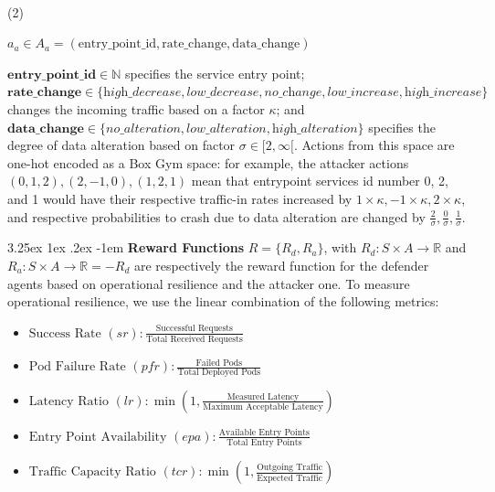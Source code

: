 \documentclass[conference]{IEEEtran}
\makeatletter
\renewcommand\paragraph{\@startsection{paragraph}{5}{\z@}%
  {3.25ex \@plus1ex \@minus.2ex}%
  {-1em}%
  {\normalfont\normalsize\bfseries}}
\makeatother
\begin{document}
\

\indent\begin{minipage}{0.06\linewidth}
    (2)
\end{minipage}
\begin{minipage}{0.9\linewidth}
    \raggedright
    $\displaystyle a_a \in A_a = (\text{entry\_point\_id}, \text{rate\_change}, \text{data\_change})$
\end{minipage}

\vspace{0.3cm}

\indent $\mathbf{entry\_point\_id} \in \mathbb{N}$ specifies the service entry point;
$\mathbf{rate\_change} \in \{\textit{high\_decrease}, \textit{low\_decrease}, \textit{no\_change}, \allowbreak \textit{low\_increase}, \allowbreak \textit{high\_increase}\}$ changes the incoming traffic based on a factor $\kappa$; and $\mathbf{data\_change} \in \{\textit{no\_alteration}, \allowbreak \textit{low\_alteration}, \allowbreak \textit{high\_alteration}\}$ specifies the degree of data alteration based on factor $\sigma \in [2,\infty[$. Actions from this space are one-hot encoded as a Box Gym space: for example, the attacker actions $(0,1,2), (2,-1,0), (1,2,1)$ mean that entrypoint services id number 0, 2, and 1 would have their respective traffic-in rates increased by $1 \times \kappa, -1 \times \kappa, 2 \times \kappa$, and respective probabilities to crash due to data alteration are changed by $\frac{2}{\sigma}, \frac{0}{\sigma}, \frac{1}{\sigma}$.


\noindent \paragraph{\textbf{Reward Functions}} $R = \{R_d, R_a\}$, with $R_d: S \times A \to \mathbb{R}$ and $R_a: S \times A \to \mathbb{R} = - R_d$ are respectively the reward function for the defender agents based on operational resilience and the attacker one.
To measure operational resilience, we use the linear combination of the following metrics:
%
\begin{itemize}
    \vspace{0.15cm}
    \item $\text{Success Rate } (sr) : \frac{\text{Successful Requests}}{\text{Total Received Requests}}$
    \vspace{0.15cm}
    \item $\text{Pod Failure Rate } (pfr) : \frac{\text{Failed Pods}}{\text{Total Deployed Pods}}$
    \vspace{0.15cm}
    \item $\text{Latency Ratio } (lr) : \min\left(1,\frac{\text{Measured Latency}}{\text{Maximum Acceptable Latency}}\right)$
    \vspace{0.15cm}    
    \item $\text{Entry Point Availability } (epa) : \frac{\text{Available Entry Points}}{\text{Total Entry Points}}$
    \vspace{0.15cm}
    \item $\text{Traffic Capacity Ratio } (tcr) : \min\left(1, \frac{\text{Outgoing Traffic}}{\text{Expected Traffic}}\right)$
\end{itemize}
\end{document}
